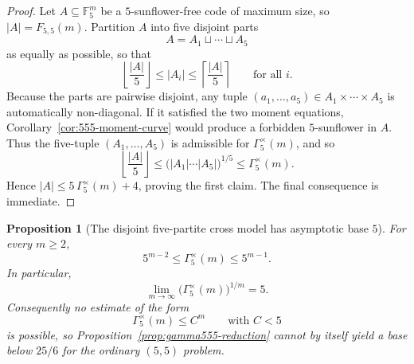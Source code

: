 \documentclass[11pt]{article}
\newtheorem{proposition}[theorem]{Proposition}
\theoremstyle{definition}
\newcommand{\1}{\mathbf{1}}
\begin{document}
\begin{proof}
Let $A\subseteq \mathbb F_5^m$ be a $5$-sunflower-free code of maximum size, so $|A|=F_{5,5}(m)$. Partition $A$ into five disjoint parts
\[
A=A_1\sqcup\cdots\sqcup A_5
\]
as equally as possible, so that
\[
\left\lfloor \frac{|A|}{5}\right\rfloor \le |A_i|\le \left\lceil \frac{|A|}{5}\right\rceil
\qquad\text{for all }i.
\]
Because the parts are pairwise disjoint, any tuple $(a_1,\dots,a_5)\in A_1\times\cdots\times A_5$ is automatically non-diagonal. If it satisfied the two moment equations, Corollary~\ref{cor:555-moment-curve} would produce a forbidden $5$-sunflower in $A$. Thus the five-tuple $(A_1,\dots,A_5)$ is admissible for $\Gamma_{5}^{\times}(m)$, and so
\[
\left\lfloor \frac{|A|}{5}\right\rfloor
\le
\bigl(|A_1|\cdots |A_5|\bigr)^{1/5}
\le
\Gamma_{5}^{\times}(m).
\]
Hence $|A|\le 5\,\Gamma_{5}^{\times}(m)+4$, proving the first claim. The final consequence is immediate.
\end{proof}

\begin{proposition}[The disjoint five-partite cross model has asymptotic base $5$]\label{prop:gamma555-base5}
For every $m\ge 2$,
\[
5^{m-2}\le \Gamma_{5}^{\times}(m)\le 5^{m-1}.
\]
In particular,
\[
\lim_{m\to\infty}\bigl(\Gamma_{5}^{\times}(m)\bigr)^{1/m}=5.
\]
Consequently no estimate of the form
\[
\Gamma_{5}^{\times}(m)\le C^m
\qquad\text{with }C<5
\]
is possible, so Proposition~\ref{prop:gamma555-reduction} cannot by itself yield a base below $25/6$ for the ordinary $(5,5)$ problem.
\end{proposition}
\end{document}
